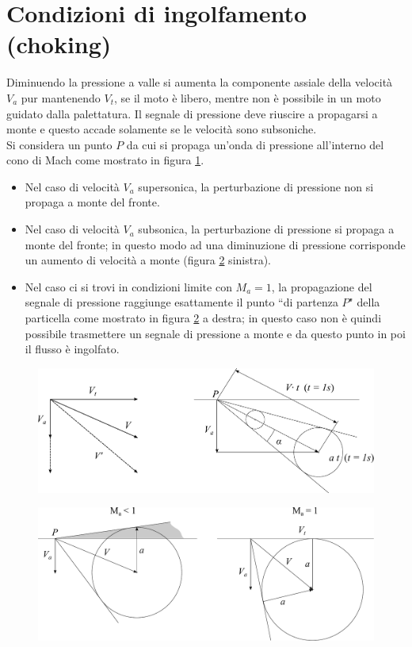 \section{Condizioni di ingolfamento (choking)}
Diminuendo la pressione a valle si aumenta la componente assiale della velocità $V_a$ pur mantenendo $V_t$, se il moto è libero, mentre non è possibile in un moto guidato dalla palettatura. Il segnale di pressione deve riuscire a propagarsi a monte e questo accade solamente se le velocità sono subsoniche.\\
Si considera un punto $P$ da cui si propaga un'onda di pressione all'interno del cono di Mach come mostrato in figura \ref{fd:bloccson1}.
\begin{itemize}
	\item Nel caso di velocità $V_a$ supersonica, la perturbazione di pressione non si propaga a monte del fronte.
	\item Nel caso di velocità $V_a$ subsonica, la perturbazione di pressione si propaga a monte del fronte; in questo modo ad una diminuzione di pressione corrisponde un aumento di velocità a monte (figura \ref{fd:bloccson2} sinistra).
	\item Nel caso ci si trovi in condizioni limite con $M_a=1$, la propagazione del segnale di pressione raggiunge esattamente il punto ``di partenza $P$" della particella come mostrato in figura \ref{fd:bloccson2} a destra; in questo caso non è quindi possibile trasmettere un segnale di pressione a monte e da questo punto in poi il flusso è ingolfato.
\end{itemize} 
\begin{figure}
\centering
  \includegraphics[width=.8\textwidth]{fig/bloccson1.pdf}
\caption{}
\label{fd:bloccson1}
\end{figure}
\begin{figure}
\centering
  \includegraphics[width=.8\textwidth]{fig/bloccson2.pdf}
\caption{}
\label{fd:bloccson2}
\end{figure}
